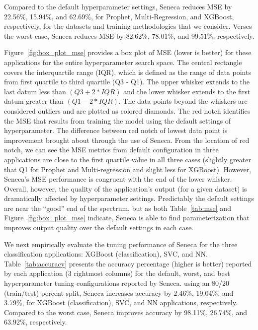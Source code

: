 Compared to the default hyperparameter settings,
Seneca reduces MSE by 22.56\%, 15.94\%, and 62.69\%, for Prophet, Multi-Regression, and XGBoost, respectively, for the datasets and training methodologies that we consider.
Verses the worst case, Seneca reduces MSE by 82.62\%, 78.01\%, and 99.51\%, respectively.

Figure~\ref{fig:box_plot_mse} provides a box plot of MSE (lower is better) for
these applications for the entire hyperparameter search space. The central
rectangle covers the interquartile range (IQR), which is defined as the range
of data points from first quartile to third quartile (Q3 - Q1).  The upper
whisker extends to the last datum less than \texttt{$(Q3 + 2 * IQR)$} and the
lower whisker extends to the first datum greater than \texttt{$(Q1 - 2 *
IQR)$}. The data points beyond the whiskers are considered outliers and are
plotted as colored diamonds. The red notch identifies the MSE that results
from training the model using the default settings of hyperparameter. The
difference between red notch of lowest data point is improvement brought about
through the use of Seneca. From the location of red notch, we can see the MSE
metrics from default configuration in three applications are close to the
first quartile value in all three cases (slightly greater that Q1 for Prophet
and Multi-regression and slight less for XGBoost). However, Seneca's MSE
performance is congruent with the end of the lower whisker.  Overall, however,
the quality of the application's output (for a given dataset) is dramatically
affected by hyperparameter settings.  Predictably the default settings are
near the ``good'' end of the spectrum, but as both Table~\ref{tab:mse} and
Figure~\ref{fig:box_plot_mse} indicate, Seneca is able to find
parameterization that improves output quality over the default settings
in each case.

We next empirically evaluate the tuning performance of Seneca for the three
classification applications: XGBoost (classification), SVC, and NN.
Table~\ref{tab:accuracy} presents the accuracy percentage (higher is
better) reported by each application (3 rightmost columns) for the default,
worst, and best hyperparameter tuning configurations reported by Seneca.
using an 80/20 (train/test) percent split,
Seneca increases accuracy by 2.46\%, 19.04\%, and 3.79\%, for XGBoost
(classification), SVC, and NN applications, respectively.  Compared to
the worst case, Seneca improves accuracy by 98.11\%, 26.74\%, and 63.92\%,
respectively.


